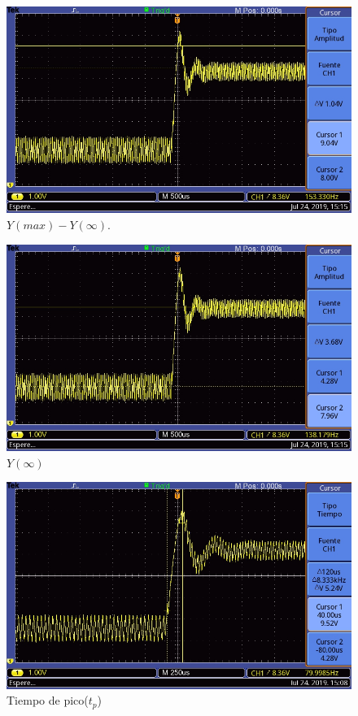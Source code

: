 \documentclass[twocolumn]{article}
\begin{document}
\begin{figure}[H]
  \centering    
  \includegraphics[width=\columnwidth]{imagenes/Ymax.jpg}
  \caption{$Y(max) - Y(\infty)$.}\label{fig:Ymax$}
\end{figure}

\begin{figure}[h]
  \centering    
  \includegraphics[width=\columnwidth]{imagenes/Yinf.jpg}
  \caption{$Y(\infty)$}\label{fig:Yinf}
\end{figure}

\begin{figure}[h]
  \centering    
  \includegraphics[width=\columnwidth]{imagenes/tp.jpg}
  \caption{Tiempo de pico($t_{p}$)}\label{fig:tp}
\end{figure}
\end{document}
